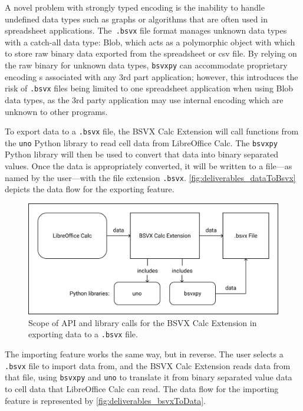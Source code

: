 \documentclass[10pt]{article}
\begin{document}
\indent{}
A novel problem with strongly typed encoding is the inability to handle undefined data types such as graphs or algorithms that are often used in spreadsheet applications.
The\texttt{ .bsvx} file format manages unknown data types with a catch-all data type: Blob, which acts as a polymorphic object with which to store raw binary data exported from the spreadsheet or csv file.
By relying on the raw binary for unknown data types, \texttt{bsvxpy} can accommodate proprietary encoding s associated with any 3rd part application; however,
this introduces the risk of \texttt{.bsvx} files being limited to one spreadsheet application when using Blob data types, as the 3rd party application may use internal encoding which are unknown to other programs.

\indent{}
To export data to a \texttt{.bsvx} file, the BSVX Calc Extension will call functions from the \texttt{uno} Python library to read cell data from LibreOffice Calc.
The \texttt{bsvxpy} Python library will then be used to convert that data into binary separated values.
Once the data is appropriately converted, it will be written to a file---as named by the user---with the file extension \texttt{.bsvx}.
\autoref{fig:deliverables_dataToBsvx} depicts the data flow for the exporting feature.

\begin{figure}[H]
\centering
\includegraphics[width=5in]{figures/dataToBsvx.png}
\caption{Scope of API and library calls for the BSVX Calc Extension in exporting data to a \texttt{.bsvx} file.}
\label{fig:deliverables_dataToBsvx}
\end{figure}

\indent{}
The importing feature works the same way, but in reverse.
The user selects a \texttt{.bsvx} file to import data from, and the BSVX Calc Extension reads data from that file, using \texttt{bsvxpy} and \texttt{uno} to translate it from binary separated value data to cell data that LibreOffice Calc can read.
The data flow for the importing feature is represented by \autoref{fig:deliverables_bsvxToData}.
    
\end{document}

